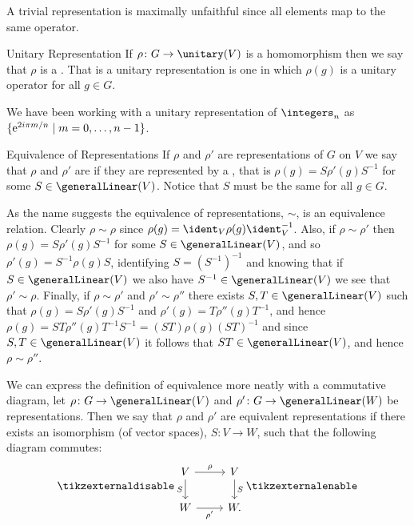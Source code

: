 A trivial representation is maximally unfaithful since all elements map to
the same operator.

\begin{dfn}{Unitary Representation}{}
    If \(\rho \colon G \to \unitary(V)\) is a homomorphism then we say that
    \(\rho\) is a .
    That is a unitary representation is one in which \(\rho(g)\) is a
    unitary operator for all \(g \in G\).
\end{dfn}

We have been working with a unitary representation of \(\integers_n\) as
\(\{\mathrm{e}^{2i\pi m/n} \mid m = 0, \dotsc, n - 1\}\).

\begin{dfn}{Equivalence of Representations}{}
    If \(\rho\) and \(\rho'\) are representations of \(G\) on \(V\) we say
    that \(\rho\) and \(\rho'\) are  if they are represented by a , that is \(\rho(g) = S\rho'(g)S^{-1}\) for some \(S \in
    \generalLinear(V)\).
    Notice that \(S\) must be the same for all \(g \in G\).
\end{dfn}

As the name suggests the equivalence of representations, \(\sim\), is an
equivalence relation.
Clearly \(\rho \sim \rho\) since \(\rho(g) = \ident_V\rho(g)\ident_V^{-1}\).
Also, if \(\rho \sim \rho'\) then \(\rho(g) = S\rho'(g)S^{-1}\) for some \(S \in \generalLinear(V)\), and so \(\rho'(g) = S^{-1}\rho(g)S\), identifying \(S = (S^{-1})^{-1}\) and knowing that if \(S \in \generalLinear(V)\) we also have \(S^{-1} \in \generalLinear(V)\) we see that \(\rho' \sim \rho\).
Finally, if \(\rho \sim \rho'\) and \(\rho' \sim \rho''\) there exists \(S, T \in \generalLinear(V)\) such that \(\rho(g) = S\rho'(g)S^{-1}\) and \(\rho'(g) = T\rho''(g)T^{-1}\), and hence \(\rho(g) = ST\rho''(g)T^{-1}S^{-1} = (ST)\rho(g)(ST)^{-1}\) and since \(S, T \in \generalLinear(V)\) it follows that \(ST \in \generalLinear(V)\), and hence \(\rho \sim \rho''\).

We can express the definition of equivalence more neatly with a commutative diagram, let \(\rho \colon G \to \generalLinear(V)\) and \(\rho' \colon G \to \generalLinear(W)\) be representations.
Then we say that \(\rho\) and \(\rho'\) are equivalent representations if there exists an isomorphism (of vector spaces), \(S \colon V \to W\), such that the following diagram commutes:
\begin{equation}
    \tikzexternaldisable
    \begin{tikzcd}
        V \arrow[r, "\rho"] \arrow[d, "S"'] & V \arrow[d, "S"]\\
        W \arrow[r, "\rho'"'] & W.
    \end{tikzcd}
    \tikzexternalenable
\end{equation}

